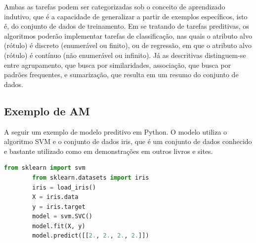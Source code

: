 \documentclass[a4paper,12pt]{book}
\begin{document}
	Ambas as tarefas podem ser categorizadas sob o conceito de aprendizado indutivo, que é a capacidade de generalizar a partir de exemplos específicos, isto é, do conjunto de dados de treinamento. Em se tratando de tarefas preditivas, os algoritmos poderão implementar tarefas de classificação, nas quais o atributo alvo (rótulo) é discreto (enumerável ou finito), ou de regressão, em que o atributo alvo (rótulo) é contínuo (não enumerável ou infinito). Já as descritivas distinguem-se entre agrupamento, que busca por similaridades, associação, que busca por padrões frequentes, e sumarização, que resulta em um resumo do conjunto de dados.


	\subsection{Exemplo de AM}

	A seguir um exemplo de modelo preditivo em Python. O modelo utiliza o algoritmo SVM e o conjunto de dados iris, que é um conjunto de dados conhecido e bastante utilizado como em demonstrações em outros livros e sites.

	\begin{lstlisting}[language=Python, caption={Exemplo de código que usa AM}]
		from sklearn import svm
		from sklearn.datasets import iris
		iris = load_iris()
		X = iris.data
		y = iris.target
		model = svm.SVC()
		model.fit(X, y)
		model.predict([[2., 2., 2., 2.]])
	\end{lstlisting}





\end{document}
